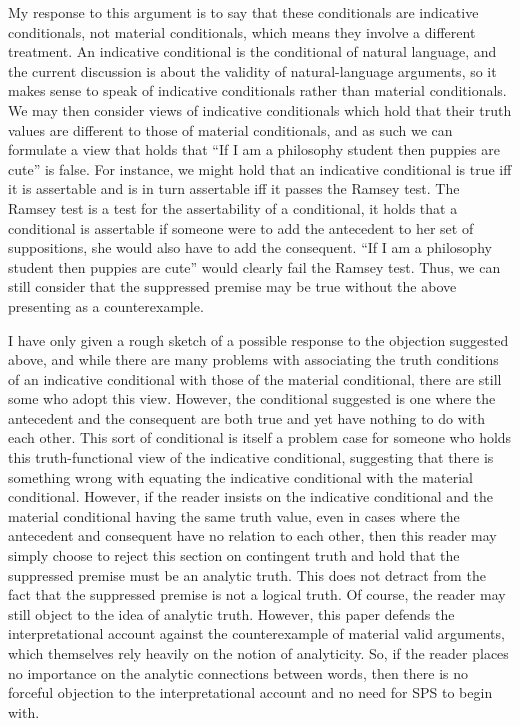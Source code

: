 My response to this argument is to say that these conditionals are
indicative conditionals, not material conditionals, which means they
involve a different treatment. An indicative conditional is the
conditional of natural language, and the current discussion is about the
validity of natural-language arguments, so it makes sense to speak of
indicative conditionals rather than material conditionals. We may then
consider views of indicative conditionals which hold that their truth
values are different to those of material conditionals, and as such we
can formulate a view that holds that ``If I am a philosophy student then
puppies are cute'' is false. For instance, we might hold that an
indicative conditional is true iff it is assertable and is in turn
assertable iff it passes the Ramsey test. The Ramsey test is a test for
the assertability of a conditional, it holds that a conditional is
assertable if someone were to add the antecedent to her set of
suppositions, she would also have to add the consequent. ``If I am a
philosophy student then puppies are cute'' would clearly fail the Ramsey
test. Thus, we can still consider that the suppressed premise may be
true without the above presenting as a counterexample.

I have only given a rough sketch of a possible response to the objection
suggested above, and while there are many problems with associating the
truth conditions of an indicative conditional with those of the material
conditional, there are still some who adopt this view. However, the
conditional suggested is one where the antecedent and the consequent are
both true and yet have nothing to do with each other. This sort of
conditional is itself a problem case for someone who holds this
truth-functional view of the indicative conditional, suggesting that
there is something wrong with equating the indicative conditional with
the material conditional. However, if the reader insists on the
indicative conditional and the material conditional having the same
truth value, even in cases where the antecedent and consequent have no
relation to each other, then this reader may simply choose to reject
this section on contingent truth and hold that the suppressed premise
must be an analytic truth. This does not detract from the fact that the
suppressed premise is not a logical truth. Of course, the reader may
still object to the idea of analytic truth. However, this paper defends
the interpretational account against the counterexample of material
valid arguments, which themselves rely heavily on the notion of
analyticity. So, if the reader places no importance on the analytic
connections between words, then there is no forceful objection to the
interpretational account and no need for SPS to begin with.

